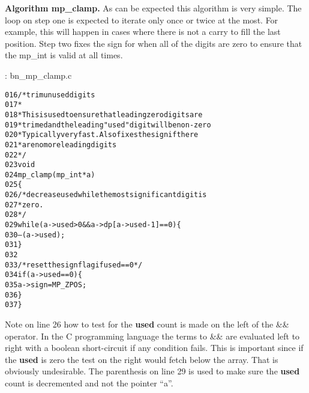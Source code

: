 \documentclass[b5paper]{book}
\begin{document}
\textbf{Algorithm mp\_clamp.}
As can be expected this algorithm is very simple.  The loop on step one is expected to iterate only once or twice at
the most.  For example, this will happen in cases where there is not a carry to fill the last position.  Step two fixes the sign for 
when all of the digits are zero to ensure that the mp\_int is valid at all times.

\vspace{+3mm}\begin{small}
\hspace{-5.1mm}{\bf File}: bn\_mp\_clamp.c
\vspace{-3mm}
\begin{alltt}
016   /* trim unused digits 
017    *
018    * This is used to ensure that leading zero digits are
019    * trimed and the leading "used" digit will be non-zero
020    * Typically very fast.  Also fixes the sign if there
021    * are no more leading digits
022    */
023   void
024   mp_clamp (mp_int * a)
025   \{
026     /* decrease used while the most significant digit is
027      * zero.
028      */
029     while (a->used > 0 && a->dp[a->used - 1] == 0) \{
030       --(a->used);
031     \}
032   
033     /* reset the sign flag if used == 0 */
034     if (a->used == 0) \{
035       a->sign = MP_ZPOS;
036     \}
037   \}
\end{alltt}
\end{small}

Note on line 26 how to test for the \textbf{used} count is made on the left of the \&\& operator.  In the C programming
language the terms to \&\& are evaluated left to right with a boolean short-circuit if any condition fails.  This is 
important since if the \textbf{used} is zero the test on the right would fetch below the array.  That is obviously 
undesirable.  The parenthesis on line 29 is used to make sure the \textbf{used} count is decremented and not
the pointer ``a''.  
\end{document}
